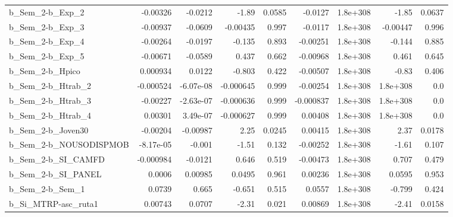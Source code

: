 \begin{tabular}{lrrrrrrrr}
b\_Sem\_2-b\_Exp\_2              &    -0.00326 &      -0.0212 &     -1.89 &   0.0585 &    -0.0127 &    1.8e+308 &        -1.85 &        0.0637 \\
b\_Sem\_2-b\_Exp\_3              &    -0.00937 &      -0.0609 &  -0.00435 &    0.997 &    -0.0117 &    1.8e+308 &     -0.00447 &         0.996 \\
b\_Sem\_2-b\_Exp\_4              &    -0.00264 &      -0.0197 &    -0.135 &    0.893 &   -0.00251 &    1.8e+308 &       -0.144 &         0.885 \\
b\_Sem\_2-b\_Exp\_5              &    -0.00671 &      -0.0589 &     0.437 &    0.662 &   -0.00968 &    1.8e+308 &        0.461 &         0.645 \\
b\_Sem\_2-b\_Hpico              &    0.000934 &       0.0122 &    -0.803 &    0.422 &   -0.00507 &    1.8e+308 &        -0.83 &         0.406 \\
b\_Sem\_2-b\_Htrab\_2            &   -0.000524 &    -6.07e-08 & -0.000645 &    0.999 &   -0.00254 &    1.8e+308 &     1.8e+308 &           0.0 \\
b\_Sem\_2-b\_Htrab\_3            &    -0.00227 &    -2.63e-07 & -0.000636 &    0.999 &  -0.000837 &    1.8e+308 &     1.8e+308 &           0.0 \\
b\_Sem\_2-b\_Htrab\_4            &     0.00301 &     3.49e-07 & -0.000627 &    0.999 &    0.00408 &    1.8e+308 &     1.8e+308 &           0.0 \\
b\_Sem\_2-b\_Joven30            &    -0.00204 &     -0.00987 &      2.25 &   0.0245 &    0.00415 &    1.8e+308 &         2.37 &        0.0178 \\
b\_Sem\_2-b\_NOUSODISPMOB       &   -8.17e-05 &       -0.001 &     -1.51 &    0.132 &   -0.00252 &    1.8e+308 &        -1.61 &         0.107 \\
b\_Sem\_2-b\_SI\_CAMFD           &   -0.000984 &      -0.0121 &     0.646 &    0.519 &   -0.00473 &    1.8e+308 &        0.707 &         0.479 \\
b\_Sem\_2-b\_SI\_PANEL           &      0.0006 &      0.00985 &    0.0495 &    0.961 &    0.00236 &    1.8e+308 &       0.0595 &         0.953 \\
b\_Sem\_2-b\_Sem\_1              &      0.0739 &        0.665 &    -0.651 &    0.515 &     0.0557 &    1.8e+308 &       -0.799 &         0.424 \\
b\_Si\_MTRP-asc\_ruta1          &     0.00743 &       0.0707 &     -2.31 &    0.021 &    0.00869 &    1.8e+308 &        -2.41 &        0.0158 \\

\end{tabular}
